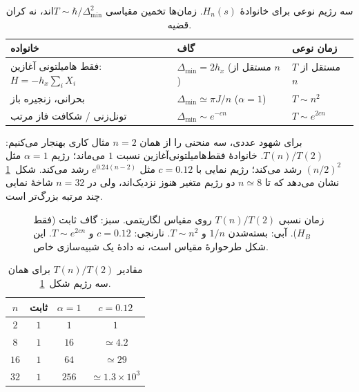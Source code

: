 \begin{table}[htbp]
	\centering
	\small
	\caption{سه رژیم نوعی برای خانوادهٔ $H_n(s)$. زمان‌ها تخمین مقیاسی $T\sim\hbar/\Delta_{\min}^{2}$اند، نه کران قضیه.}
	\label{tab:scaling-regimes}
	\begin{tabularx}{\textwidth}{@{}
			>{\raggedright\arraybackslash}p{4.4cm}
			>{\raggedright\arraybackslash}X
			>{\raggedright\arraybackslash}p{3.6cm}
			@{}}
		\toprule
		\rowcolor{gray!14}
		\textbf{خانواده} & \textbf{گاف} & \textbf{زمان نوعی} \\
		\midrule
		فقط هامیلتونی آغازین: $H=-h_x\sum_i X_i$
		& $\Delta_{\min}=2h_x$ (مستقل از $n$)
		& $T$ مستقل از $n$
		\\
		\rowcolor{gray!8}
		\lr{TFIM} بحرانی، زنجیره باز
		& $\Delta_{\min}\simeq\pi J/n$ \quad($\alpha=1$)
		& $T\sim n^{2}$
		\\
		تونل‌زنی / شکافت فاز مرتب
		& $\Delta_{\min}\sim e^{-cn}$
		& $T\sim e^{2cn}$
		\\
		\bottomrule
	\end{tabularx}
\end{table}

برای شهود عددی، سه منحنی را از همان $n=2$ مثال کاری بهنجار می‌کنیم:
$T(n)/T(2)$.
خانوادهٔ فقط‌هامیلتونی‌آغازین نسبت $1$ می‌ماند؛ رژیم $\alpha=1$ مثل $(n/2)^{2}$ رشد می‌کند؛ رژیم نمایی با $c=0.12$ مثل $e^{0.24(n-2)}$ رشد می‌کند.
شکل~\ref{fig:complexity-scaling} نشان می‌دهد که تا $n\simeq8$ دو رژیم متغیر هنوز نزدیک‌اند، ولی در $n=32$ شاخهٔ نمایی چند مرتبه بزرگ‌تر است.

\begin{figure}[htbp]
	\centering
	\begin{latin}
		\resizebox{0.92\textwidth}{!}{%
		}
	\end{latin}
	\caption{زمان نسبی $T(n)/T(2)$ روی مقیاس لگاریتمی.
		سبز: گاف ثابت (فقط $H_B$).
		آبی: بسته‌شدن $1/n$ و $T\sim n^{2}$.
		نارنجی: $c=0.12$ و $T\sim e^{2cn}$.
		این شکل طرحوارهٔ مقیاس است، نه دادهٔ یک شبیه‌سازی خاص.}
	\label{fig:complexity-scaling}
\end{figure}

\begin{table}[htbp]
	\centering
	\small
	\caption{مقادیر $T(n)/T(2)$ برای همان سه رژیم شکل~\ref{fig:complexity-scaling}.}
	\label{tab:scaling-numbers}
	\begin{tabular}{cccc}
		\toprule
		\rowcolor{gray!14}
		$n$ & ثابت & $\alpha=1$ & $c=0.12$ \\
		\midrule
		$2$ & $1$ & $1$ & $1$ \\
		\rowcolor{gray!8}
		$8$ & $1$ & $16$ & $\simeq4.2$ \\
		$16$ & $1$ & $64$ & $\simeq29$ \\
		\rowcolor{gray!8}
		$32$ & $1$ & $256$ & $\simeq1.3\times10^{3}$ \\
		\bottomrule
	\end{tabular}
\end{table}

